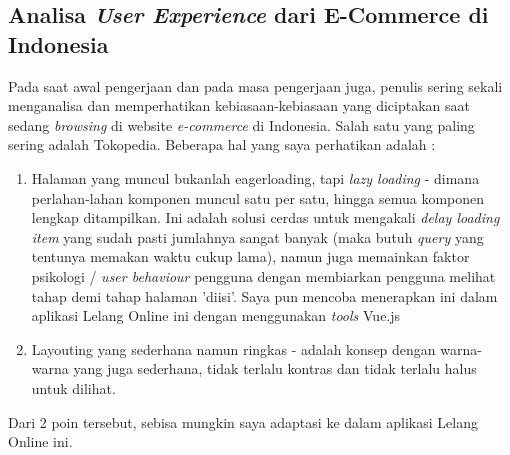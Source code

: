 
	\subsection{Analisa \textit{User Experience} dari E-Commerce di Indonesia}
    \label{alasan-ux-ecommerce-indonesia}
    Pada saat awal pengerjaan dan pada masa pengerjaan juga, penulis sering sekali menganalisa dan memperhatikan kebiasaan-kebiasaan yang diciptakan saat sedang \textit{browsing} di website \textit{e-commerce} di Indonesia. Salah satu yang paling sering adalah Tokopedia.
    Beberapa hal yang saya perhatikan adalah :
    \begin{enumerate}
    \item Halaman yang muncul bukanlah eagerloading, tapi \textit{lazy loading} - dimana perlahan-lahan komponen muncul satu per satu, hingga semua komponen lengkap ditampilkan.
    \linebreak
    Ini adalah solusi cerdas untuk mengakali \textit{delay loading item} yang sudah pasti jumlahnya sangat banyak (maka butuh \textit{query} yang tentunya memakan waktu cukup lama), namun juga memainkan faktor psikologi / \textit{user behaviour} pengguna dengan membiarkan pengguna melihat tahap demi tahap halaman 'diisi'.
    \linebreak
    Saya pun mencoba menerapkan ini dalam aplikasi Lelang Online ini dengan menggunakan \textit{tools} Vue.js
    \item Layouting yang sederhana namun ringkas - adalah konsep dengan warna-warna yang juga sederhana, tidak terlalu kontras dan tidak terlalu halus untuk dilihat.
    \end{enumerate}
    Dari 2 poin tersebut, sebisa mungkin saya adaptasi ke dalam aplikasi Lelang Online ini.
    
